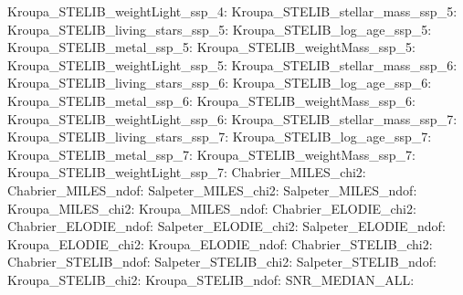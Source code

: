 Kroupa\_STELIB\_weightLight\_ssp\_4:  \newline 
Kroupa\_STELIB\_stellar\_mass\_ssp\_5:  \newline 
Kroupa\_STELIB\_living\_stars\_ssp\_5:  \newline 
Kroupa\_STELIB\_log\_age\_ssp\_5:  \newline 
Kroupa\_STELIB\_metal\_ssp\_5:  \newline 
Kroupa\_STELIB\_weightMass\_ssp\_5:  \newline 
Kroupa\_STELIB\_weightLight\_ssp\_5:  \newline 
Kroupa\_STELIB\_stellar\_mass\_ssp\_6:  \newline 
Kroupa\_STELIB\_living\_stars\_ssp\_6:  \newline 
Kroupa\_STELIB\_log\_age\_ssp\_6:  \newline 
Kroupa\_STELIB\_metal\_ssp\_6:  \newline 
Kroupa\_STELIB\_weightMass\_ssp\_6:  \newline 
Kroupa\_STELIB\_weightLight\_ssp\_6:  \newline 
Kroupa\_STELIB\_stellar\_mass\_ssp\_7:  \newline 
Kroupa\_STELIB\_living\_stars\_ssp\_7:  \newline 
Kroupa\_STELIB\_log\_age\_ssp\_7:  \newline 
Kroupa\_STELIB\_metal\_ssp\_7:  \newline 
Kroupa\_STELIB\_weightMass\_ssp\_7:  \newline 
Kroupa\_STELIB\_weightLight\_ssp\_7:  \newline 
Chabrier\_MILES\_chi2:  \newline 
Chabrier\_MILES\_ndof:  \newline 
Salpeter\_MILES\_chi2:  \newline 
Salpeter\_MILES\_ndof:  \newline 
Kroupa\_MILES\_chi2:  \newline 
Kroupa\_MILES\_ndof:  \newline 
Chabrier\_ELODIE\_chi2:  \newline 
Chabrier\_ELODIE\_ndof:  \newline 
Salpeter\_ELODIE\_chi2:  \newline 
Salpeter\_ELODIE\_ndof:  \newline 
Kroupa\_ELODIE\_chi2:  \newline 
Kroupa\_ELODIE\_ndof:  \newline 
Chabrier\_STELIB\_chi2:  \newline 
Chabrier\_STELIB\_ndof:  \newline 
Salpeter\_STELIB\_chi2:  \newline 
Salpeter\_STELIB\_ndof:  \newline 
Kroupa\_STELIB\_chi2:  \newline 
Kroupa\_STELIB\_ndof:  \newline 
SNR\_MEDIAN\_ALL:  \newline 
